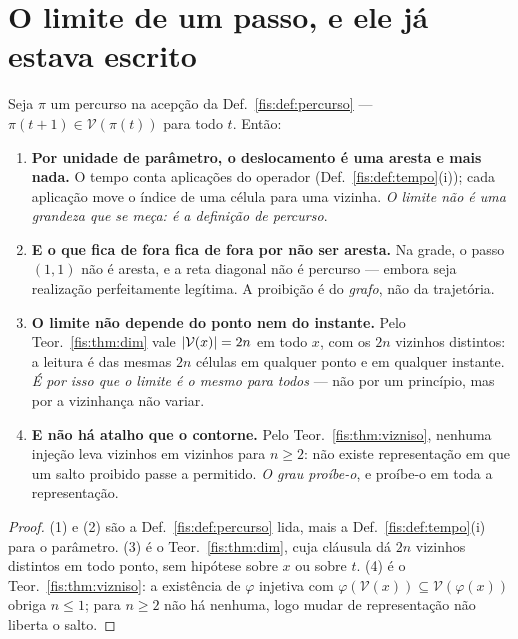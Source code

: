 \documentclass[livro.tex]{subfiles}
\begin{document}
\section{O limite de um passo, e ele já estava escrito}\label{fis:rel-passo}

\begin{teorema}\label{fis:thm:passo}
Seja $\pi$ um percurso na acepção da Def.~\ref{fis:def:percurso} ---
$\pi(t+1)\in\mathcal{V}(\pi(t))$ para todo $t$. Então:
\begin{enumerate}\itemsep3pt
\item[(1)] \textbf{Por unidade de parâmetro, o deslocamento é uma aresta e mais
nada.} O tempo conta aplicações do operador (Def.~\ref{fis:def:tempo}(i)); cada
aplicação move o índice de uma célula para uma vizinha. \emph{O limite não é uma
grandeza que se meça: é a definição de percurso}.
\item[(2)] \textbf{E o que fica de fora fica de fora por não ser aresta.} Na
grade, o passo $(1,1)$ não é aresta, e a reta diagonal não é percurso --- embora
seja realização perfeitamente legítima. A proibição é do \emph{grafo}, não da
trajetória.
\item[(3)] \textbf{O limite não depende do ponto nem do instante.} Pelo
Teor.~\ref{fis:thm:dim} vale $\lvert \mathcal{V}(x)\rvert=2n$ em todo $x$, com os $2n$
vizinhos distintos: a leitura é das mesmas $2n$ células em qualquer ponto e em
qualquer instante. \emph{É por isso que o limite é o mesmo para todos} --- não
por um princípio, mas por a vizinhança não variar.
\item[(4)] \textbf{E não há atalho que o contorne.} Pelo
Teor.~\ref{fis:thm:vizniso}, nenhuma injeção leva vizinhos em vizinhos para
$n\ge2$: não existe representação em que um salto proibido passe a permitido.
\emph{O grau proíbe-o}, e proíbe-o em toda a representação.
\end{enumerate}
\end{teorema}

\begin{proof}
(1) e (2) são a Def.~\ref{fis:def:percurso} lida, mais a
Def.~\ref{fis:def:tempo}(i) para o parâmetro. (3) é o Teor.~\ref{fis:thm:dim},
cuja cláusula dá $2n$ vizinhos distintos em todo ponto, sem hipótese sobre $x$ ou
sobre $t$. (4) é o Teor.~\ref{fis:thm:vizniso}: a existência de $\varphi$ injetiva
com $\varphi(\mathcal{V}(x))\subseteq\mathcal{V}(\varphi(x))$ obriga $n\le1$; para
$n\ge2$ não há nenhuma, logo mudar de representação não liberta o salto.
\end{proof}
\end{document}
